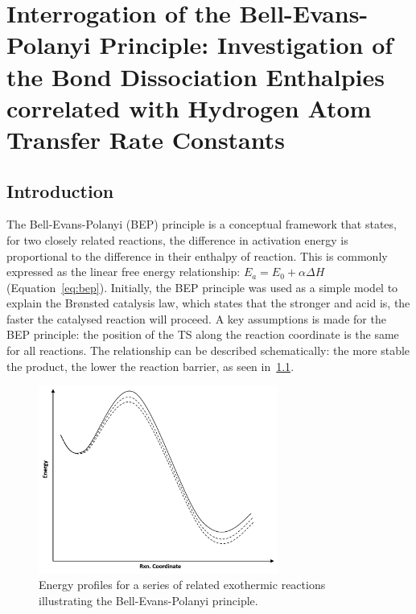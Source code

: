 
\chapter{Interrogation of the Bell-Evans-Polanyi Principle: Investigation of the Bond Dissociation Enthalpies correlated with Hydrogen Atom Transfer Rate Constants}
\label{ch:bde}

\section{Introduction}

The Bell-Evans-Polanyi (BEP) principle is a conceptual framework that states, for two closely related reactions, the difference in activation energy is proportional to the difference in their enthalpy of reaction.\cite{Bell1936,Evans1938,Dill2003} This is commonly expressed as the linear free energy relationship: $E_a = E_0 + \alpha \Delta H$ (Equation~\ref{eq:bep}). Initially, the BEP principle was used as a simple model to explain the Br{\o}nsted catalysis law, which states that the stronger and acid is, the faster the catalysed reaction will proceed.\cite{Bronsted1924} A key assumptions is made for the BEP principle: the position of the TS along the reaction coordinate is the same for all reactions. The relationship can be described schematically: the more stable the product, the lower the reaction barrier, as seen in~\ref{fig:bep}.

\begin{figure}[H]
  \centering
  \includegraphics[width=0.7\textwidth]{figures/bep}
  \caption{Energy profiles for a series of related exothermic reactions illustrating the Bell-Evans-Polanyi principle.}
\label{fig:bep}
\end{figure}

